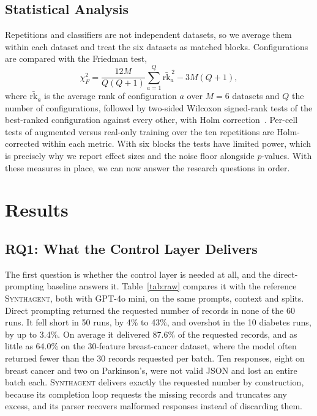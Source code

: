 \documentclass[conference]{IEEEtran}
\newcommand{\system}{\textsc{Synthagent}\xspace}
\begin{document}
\subsection{Statistical Analysis}
Repetitions and classifiers are not independent datasets, so we average them within each dataset and treat the six datasets as matched blocks. Configurations are compared with the Friedman test,
\begin{equation}
\chi^2_F=\frac{12M}{Q(Q+1)}\sum_{a=1}^{Q}\bar{\mathrm{rk}}_a^{\,2}-3M(Q+1),
\label{eq:friedman}
\end{equation}
where $\bar{\mathrm{rk}}_a$ is the average rank of configuration $a$ over $M=6$ datasets and $Q$ the number of configurations, followed by two-sided Wilcoxon signed-rank tests of the best-ranked configuration against every other, with Holm correction~\cite{demsar2006statistical,holm1979procedure}. Per-cell tests of augmented versus real-only training over the ten repetitions are Holm-corrected within each metric. With six blocks the tests have limited power, which is precisely why we report effect sizes and the noise floor alongside $p$-values. With these measures in place, we can now answer the research questions in order.

\section{Results}
\label{sec:results}
\subsection{RQ1: What the Control Layer Delivers}
\label{sec:rq1}
The first question is whether the control layer is needed at all, and the direct-prompting baseline answers it. Table~\ref{tab:raw} compares it with the reference \system, both with GPT-4o mini, on the same prompts, context and splits. Direct prompting returned the requested number of records in none of the 60 runs. It fell short in 50 runs, by 4\% to 43\%, and overshot in the 10 diabetes runs, by up to 3.4\%. On average it delivered 87.6\% of the requested records, and as little as 64.0\% on the 30-feature breast-cancer dataset, where the model often returned fewer than the 30 records requested per batch. Ten responses, eight on breast cancer and two on Parkinson's, were not valid JSON and lost an entire batch each. \system delivers exactly the requested number by construction, because its completion loop requests the missing records and truncates any excess, and its parser recovers malformed responses instead of discarding them.
\end{document}
